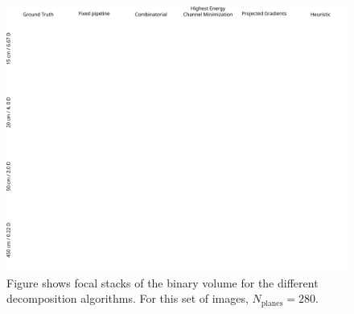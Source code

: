 \begin{figure}[!htb]
\centering
\includegraphics[width=0.99\columnwidth]{images/volumetric/acd_exp10/exp_FS}
\caption[Adaptive color decomposition: focal stack]{Figure shows focal stacks of the binary volume for the different decomposition algorithms. For this set of images, $N_{\text{planes}}=280.$}
\label{fig:volumetric:acd:exp10:focalstack}
\end{figure}

